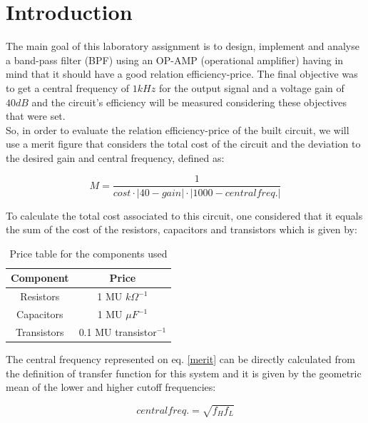 \section{Introduction}
The main goal of this laboratory assignment is to design, implement and analyse a band-pass filter (BPF) using an OP-AMP (operational amplifier) having in mind that it should have a good relation efficiency-price. The final objective was to get a central frequency of $1kHz$ for the output signal and a voltage gain of $40dB$ and the circuit's efficiency will be measured considering these objectives that were set. \\

So, in order to evaluate the relation efficiency-price of the built circuit, we will use a merit figure that considers the total cost of the circuit and the deviation to the desired gain and central frequency, defined as:

\begin{equation}
    M = \frac{1}{cost \cdot |40 - gain| \cdot |1000 - central freq.|}
    \label{merit}
\end{equation}

To calculate the total cost associated to this circuit, one considered that it equals the sum of the cost of the resistors, capacitors and transistors which is given by:

\begin{table}[H]
    \centering
    \begin{tabular}{|c|c|}
        \hline
        \textbf{Component} &  \textbf{Price}\\
        \hline
        Resistors & 1 MU $k\Omega^{-1}$ \\ \hline
        Capacitors & 1 MU $\mu F^{-1}$ \\ \hline
        Transistors & 0.1 MU transistor$^{-1}$\\
        \hline
    \end{tabular}
    \caption{Price table for the components used}
    \label{tab:price}
\end{table}

The central frequency represented on eq. \eqref{merit} can be directly calculated from the definition of transfer function for this system and it is given by the geometric mean of the lower and higher cutoff frequencies:

\begin{equation}
    central freq. = \sqrt{f_H f_L}
\end{equation}

